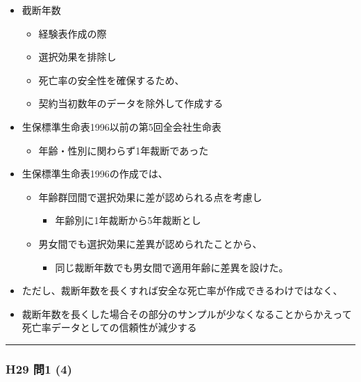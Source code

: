 \documentclass[]{article}
\begin{document}
\begin{itemize}
\tightlist
\item
  截断年数

  \begin{itemize}
  \tightlist
  \item
    経験表作成の際
  \item
    選択効果を排除し
  \item
    死亡率の安全性を確保するため、
  \item
    契約当初数年のデータを除外して作成する
  \end{itemize}
\item
  生保標準生命表1996以前の第5回全会社生命表

  \begin{itemize}
  \tightlist
  \item
    年齢・性別に関わらず1年裁断であった
  \end{itemize}
\item
  生保標準生命表1996の作成では、

  \begin{itemize}
  \tightlist
  \item
    年齢群団間で選択効果に差が認められる点を考慮し

    \begin{itemize}
    \tightlist
    \item
      年齢別に1年裁断から5年裁断とし
    \end{itemize}
  \item
    男女間でも選択効果に差異が認められたことから、

    \begin{itemize}
    \tightlist
    \item
      同じ裁断年数でも男女間で適用年齢に差異を設けた。
    \end{itemize}
  \end{itemize}
\item
  ただし、裁断年数を長くすれば安全な死亡率が作成できるわけではなく、
\item
  裁断年数を長くした場合その部分のサンプルが少なくなることからかえって死亡率データとしての信頼性が減少する
\end{itemize}

\begin{center}\rule{0.5\linewidth}{0.5pt}\end{center}

\hypertarget{h29-ux554f1-4}{%
\subsubsection{H29 問1 (4)}\label{h29-ux554f1-4}}
\end{document}
